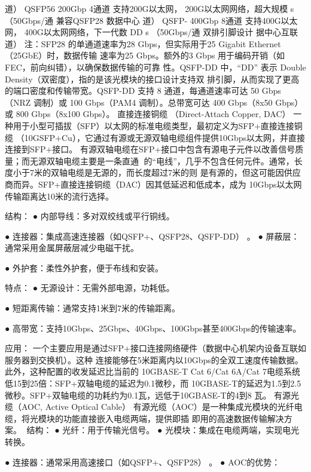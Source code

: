                 道）
 QSFP56 200Gbp 4通道        支持200G以太网， 200G以太网网络，超大规模
        s       （50Gbps/通 兼容QSFP28   数据中心
                道）
 QSFP- 400Gbp 8通道         支持400G以太网， 400G以太网网络，下一代数
 DD     s       （50Gbps/通 双排引脚设计     据中心互联
                道）
注：SFP28 的单通道速率为28 Gbps，但实际用于25 Gigabit Ethernet（25GbE）时，数据传输
速率为25 Gbps。额外的3 Gbps 用于编码开销（如FEC，前向纠错），以确保数据传输的可靠
性。QSFP-DD 中，“DD” 表示 Double Density（双密度），指的是该光模块的接口设计支持双
排引脚，从而实现了更高的端口密度和传输带宽。QSFP-DD 支持 8 通道，每通道速率可达 50
Gbps（NRZ 调制）或 100 Gbps（PAM4 调制）。总带宽可达 400 Gbps（8x50 Gbps） 或 800
Gbps（8x100 Gbps）。
直接连接铜缆 （Direct-Attach Copper, DAC）
一种用于小型可插拔（SFP）以太网的标准电缆类型，最初定义为SFP+直接连接铜缆
（10GSFP+Cu），它通过有源或无源双轴电缆组件提供10Gbps以太网，并直接连接到SFP+接口。
有源双轴电缆在SFP+接口中包含有源电子元件以改善信号质量；而无源双轴电缆主要是一条直通
的“电线”，几乎不包含任何元件。通常，长度小于7米的双轴电缆是无源的，而长度超过7米的则
是有源的，但这可能因供应商而异。SFP+直接连接铜缆（DAC）因其低延迟和低成本，成为
10Gbps以太网传输距离达10米的流行选择。




结构：
  ● 内部导线：多对双绞线或平行铜线。

  ● 连接器：集成高速连接器（如QSFP+、QSFP28、QSFP-DD）       。
  ● 屏蔽层：通常采用金属屏蔽层减少电磁干扰。

  ● 外护套：柔性外护套，便于布线和安装。

特点：
  ● 无源设计：无需外部电源，功耗低。

  ● 短距离传输：通常支持1米到7米的传输距离。

  ● 高带宽：支持10Gbps、25Gbps、40Gbps、100Gbps甚至400Gbps的传输速率。

应用：
一个主要应用是通过SFP+接口连接网络硬件（数据中心机架内设备互联如服务器到交换机）。这种
连接能够在5米距离内以10Gbps的全双工速度传输数据。此外，这种配置的收发延迟比当前的
10GBASE-T Cat 6/Cat 6A/Cat 7电缆系统低15到25倍：SFP+双轴电缆的延迟为0.1微秒，而
10GBASE-T的延迟为1.5到2.5微秒。SFP+双轴电缆的功耗约为0.1瓦，远低于10GBASE-T的4到8
瓦。
有源光缆（AOC, Active Optical Cable）
有源光缆（AOC）是一种集成光模块的光纤电缆，将光模块的功能直接嵌入电缆两端，提供即插
即用的高速数据传输解决方案。
结构：
 ● 光纤：用于传输光信号。
 ● 光模块：集成在电缆两端，实现电光转换。

 ● 连接器：通常采用高速接口（如QSFP+、QSFP28）   。
 ● AOC的优势：

